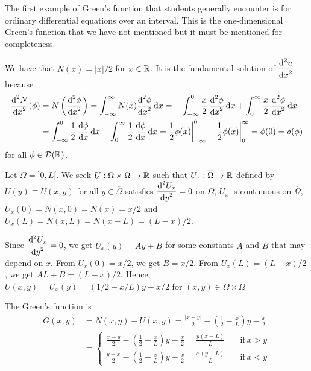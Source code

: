 \begin{egg}
The first example of Green's function that students generally
encounter is for ordinary differential equations over an interval.
This is the one-dimensional Green's function that we have not
mentioned but it must be mentioned for completeness.

We have that $N(x) = |x|/2$ for $x \in \mathbb{R}$.  It is the
fundamental solution of $\displaystyle \frac{\displaystyle \mathrm{d}^{2}{u}} {\displaystyle \mathrm{d}{x}^{2}}$ because
\begin{align*}
\frac{\displaystyle \mathrm{d}^{2}{N}} {\displaystyle \mathrm{d}{x}^{2}}(\phi) &= N\left(\frac{\displaystyle \mathrm{d}^{2}{\phi}} {\displaystyle \mathrm{d}{x}^{2}}\right)
= \int_{-\infty}^\infty N(x)\frac{\displaystyle \mathrm{d}^{2}{\phi}} {\displaystyle \mathrm{d}{x}^{2}} \,\mathrm{d}{x}
= -\int_{-\infty}^0 \frac{x}{2}\,\frac{\displaystyle \mathrm{d}^{2}{\phi}} {\displaystyle \mathrm{d}{x}^{2}} \,\mathrm{d}{x}
+ \int_0^\infty \frac{x}{2}\,\frac{\displaystyle \mathrm{d}^{2}{\phi}} {\displaystyle \mathrm{d}{x}^{2}} \,\mathrm{d}{x} \\
&= \int_{-\infty}^0 \frac{1}{2}\,\frac{\mathrm{d}\phi}{\mathrm{d}{x}} \,\mathrm{d}{x}
- \int_0^\infty \frac{1}{2}\,\frac{\mathrm{d}\phi}{\mathrm{d}{x}} \,\mathrm{d}{x}
= \frac{1}{2} \phi(x)\bigg|_{-\infty}^0 - \frac{1}{2} \phi(x)\bigg|_0^\infty
= \phi(0) = \delta(\phi)
\end{align*}
for all $\phi \in \mathcal{D}(\mathbb{R})$.

Let $\Omega = ]0,L[$.  We seek $U:\Omega \times \overline{\Omega} \to \mathbb{R}$
such that $U_x:\overline{\Omega} \to \mathbb{R}$ defined by
$U(y) \equiv U(x,y)$ for all $y \in \overline{\Omega}$ satisfies
$\displaystyle \frac{\displaystyle \mathrm{d}^{2}{U_x}} {\displaystyle \mathrm{d}{y}^{2}} = 0$ on $\Omega$, $U_x$ is continuous
on $\overline{\Omega}$, $U_x(0) = N(x,0) = N(x) = x/2$ and
$U_x(L) = N(x,L) = N(x-L) = (L-x)/2$.

Since $\displaystyle \frac{\displaystyle \mathrm{d}^{2}{U_x}} {\displaystyle \mathrm{d}{y}^{2}} = 0$, we get $U_x(y) = Ay + B$
for some constants $A$ and $B$ that may depend on $x$.  From
$U_x(0) = x/2$, we get $B= x/2$.  From 
$U_x(L) = (L-x)/2$, we get $AL + B = (L-x)/2$.  Hence,
$U(x,y) = U_x(y) = (1/2 -x/L)y + x/2$ for
$(x,y) \in \Omega \times \overline{\Omega}$

The Green's function is
\begin{align*}
G(x,y) &= N(x,y) - U(x,y)
= \frac{|x-y|}{2} - \left(\frac{1}{2} -\frac{x}{L}\right)y -
\frac{x}{2} \\
&= \begin{cases}
\displaystyle
\frac{x-y}{2} - \left(\frac{1}{2} -\frac{x}{L}\right)y - \frac{x}{2}
= \frac{y(x-L)}{L} & \quad \text{if} \ x > y \\
\displaystyle
\frac{y-x}{2} - \left(\frac{1}{2} -\frac{x}{L}\right)y - \frac{x}{2}
= \frac{x(y-L)}{L} & \quad \text{if} \ x < y
\end{cases}
\end{align*}
\end{egg}

